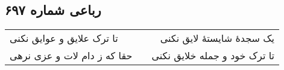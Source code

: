 \begin{center}
\section*{رباعی شماره ۶۹۷}
\label{sec:sh697}
\begin{longtable}{l p{0.5cm} r}
تا ترک علایق و عوایق نکنی
&&
یک سجدهٔ شایستهٔ لایق نکنی
\\
حقا که ز دام لات و عزی نرهی
&&
تا ترک خود و جمله خلایق نکنی
\\
\end{longtable}
\end{center}
